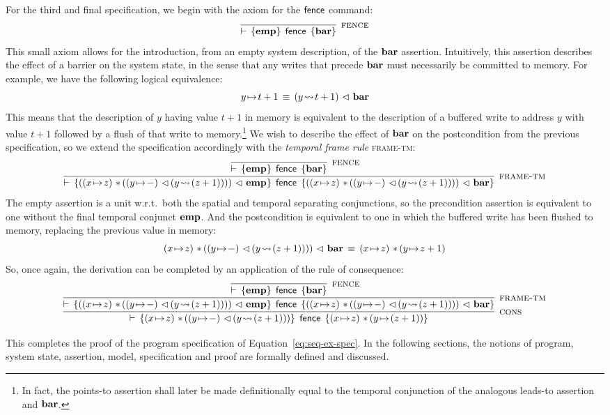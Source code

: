 \documentclass[11pt]{report}
\begin{document}
For the third and final specification, we begin with the axiom for the $\operatorname{\mathsf{fence}}$ command: \[ \infer[\textsc{fence}]{\triple{\femp}{\cfence}{\fbaru}}{}\] This small axiom allows for the introduction, from an empty system description, of the $\mathbf{bar}$ assertion. Intuitively, this assertion describes the effect of a barrier on the system state, in the sense that any writes that precede $\mathbf{bar}$ must necessarily be committed to memory. For example, we have the following logical equivalence: \[ y \!\mapsto\! t+1 \,\equiv\, (y \!\leadsto\! t+1) \operatorname{\,\vartriangleleft\,} \mathbf{bar} \] This means that the description of $y$ having value $t+1$ in memory is equivalent to the description of a buffered write to address $y$ with value $t+1$ followed by a flush of that write to memory.\footnote{In fact, the points-to assertion shall later be made definitionally equal to the temporal conjunction of the analogous leads-to assertion and $\mathbf{bar}$.} We wish to describe the effect of $\mathbf{bar}$ on the postcondition from the previous specification, so we extend the specification accordingly with the \emph{temporal frame rule} \textsc{frame-tm}: 
\[ \infer[\textsc{frame-tm}]{\triple{((x \fpointsto z) \fsep ((y \fpointsto -) \fseq (y \fwriteu (z+1)))) \fseq \femp}{\cfence}{((x \fpointsto z) \fsep ((y \fpointsto -) \fseq (y \fwriteu (z+1)))) \fseq \fbaru}}{
\infer[\textsc{fence}]{\triple{\femp}{\cfence}{\fbaru}}{}}
\] The empty assertion is a unit w.r.t.\ both the spatial and temporal separating conjunctions, so the precondition assertion is equivalent to one without the final temporal conjunct $\mathbf{emp}$. And the postcondition is equivalent to one in which the buffered write has been flushed to memory, replacing the previous value in memory: \[ (x \fpointsto z) \fsep ((y \fpointsto -) \fseq (y \fwriteu (z+1)))) \fseq \fbaru \sequiv (x \fpointsto z) \fsep (y \fpointsto z+1)\] So, once again, the derivation can be completed by an application of the rule of consequence: \[ \infer[\textsc{cons}]{\triple{(x \fpointsto z) \fsep ((y \fpointsto -) \fseq (y \fwriteu (z+1)))}{\cfence}{(x \fpointsto z) \fsep (y \fpointsto (z+1))}}{\infer[\textsc{frame-tm}]{\triple{((x \fpointsto z) \fsep ((y \fpointsto -) \fseq (y \fwriteu (z+1)))) \fseq \femp}{\cfence}{((x \fpointsto z) \fsep ((y \fpointsto -) \fseq (y \fwriteu (z+1)))) \fseq \fbaru}}{
\infer[\textsc{fence}]{\triple{\femp}{\cfence}{\fbaru}}{}}}\]

This completes the proof of the program specification of Equation~\ref{eq:seq-ex-spec}. In the following sections, the notions of program, system state, assertion, model, specification and proof are formally defined and discussed.
\end{document}
